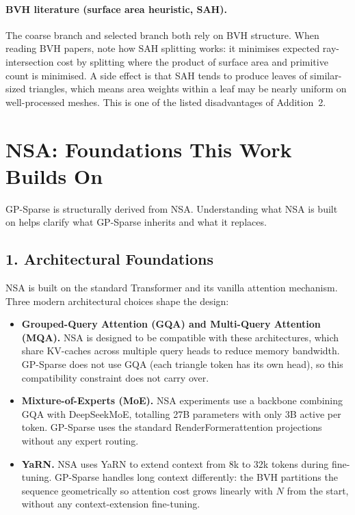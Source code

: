 \documentclass[11pt,letterpaper]{article}
\newcommand{\RF}{RenderFormer}
\begin{document}
\paragraph{BVH literature (surface area heuristic, SAH).}
The coarse branch and selected branch both rely on BVH structure.
When reading BVH papers, note how SAH splitting works: it minimises
expected ray-intersection cost by splitting where the product of
surface area and primitive count is minimised.
A side effect is that SAH tends to produce leaves of similar-sized
triangles, which means area weights within a leaf may be nearly
uniform on well-processed meshes.
This is one of the listed disadvantages of Addition~2.

\section*{NSA: Foundations This Work Builds On}

GP-Sparse is structurally derived from NSA.
Understanding what NSA is built on helps clarify what GP-Sparse inherits
and what it replaces.

\subsection*{1. Architectural Foundations}

NSA is built on the standard Transformer and its vanilla attention
mechanism.
Three modern architectural choices shape the design:

\begin{itemize}[nosep]
  \item \textbf{Grouped-Query Attention (GQA) and Multi-Query Attention
    (MQA).} NSA is designed to be compatible with these architectures,
    which share KV-caches across multiple query heads to reduce memory
    bandwidth.
    GP-Sparse does not use GQA (each triangle token has its own head),
    so this compatibility constraint does not carry over.
  \item \textbf{Mixture-of-Experts (MoE).} NSA experiments use a backbone
    combining GQA with DeepSeekMoE, totalling 27B parameters with only
    3B active per token.
    GP-Sparse uses the standard \RF attention projections without any
    expert routing.
  \item \textbf{YaRN.} NSA uses YaRN to extend context from 8k to 32k
    tokens during fine-tuning.
    GP-Sparse handles long context differently: the BVH partitions the
    sequence geometrically so attention cost grows linearly with $N$
    from the start, without any context-extension fine-tuning.
\end{itemize}
\end{document}
